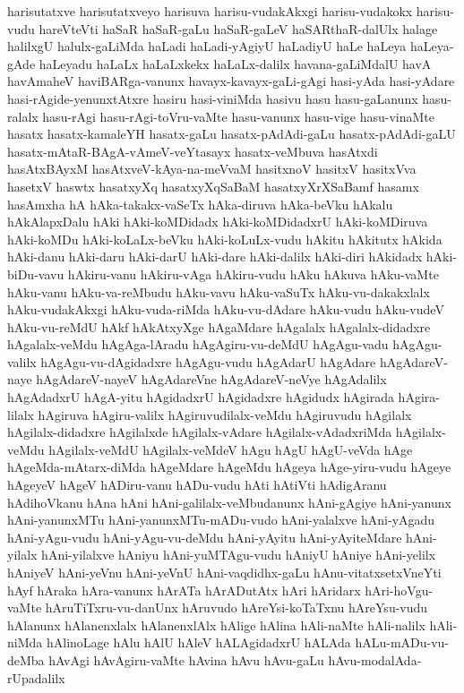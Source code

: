{harisutatxve
harisutatxveyo
harisuva
harisu-vudakAkxgi
harisu-vudakokx
harisu-vudu
hareVteVti
haSaR
haSaR-gaLu
haSaR-gaLeV
haSARthaR-dalUlx
halage
halilxgU
halulx-gaLiMda
haLadi
haLadi-yAgiyU
haLadiyU
haLe
haLeya
haLeya-gAde
haLeyadu
haLaLx
haLaLxkekx
haLaLx-dalilx
havana-gaLiMdalU
havA
havAmaheV
haviBARga-vanunx
havayx-kavayx-gaLi-gAgi
hasi-yAda
hasi-yAdare
hasi-rAgide-yenunxtAtxre
hasiru
hasi-viniMda
hasivu
hasu
hasu-gaLanunx
hasu-ralalx
hasu-rAgi
hasu-rAgi-toVru-vaMte
hasu-vanunx
hasu-vige
hasu-vinaMte
hasatx
hasatx-kamaleYH
hasatx-gaLu
hasatx-pAdAdi-gaLu
hasatx-pAdAdi-gaLU
hasatx-mAtaR-BAgA-vAmeV-veYtasayx
hasatx-veMbuva
hasAtxdi
hasAtxBAyxM
hasAtxveV-kAya-na-meVvaM
hasitxnoV
hasitxV
hasitxVva
hasetxV
haswtx
hasatxyXq
hasatxyXqSaBaM
hasatxyXrXSaBamf
hasamx
hasAmxha
hA
hAka-takakx-vaSeTx
hAka-diruva
hAka-beVku
hAkalu
hAkAlapxDalu
hAki
hAki-koMDidadx
hAki-koMDidadxrU
hAki-koMDiruva
hAki-koMDu
hAki-koLaLx-beVku
hAki-koLuLx-vudu
hAkitu
hAkitutx
hAkida
hAki-danu
hAki-daru
hAki-darU
hAki-dare
hAki-dalilx
hAki-diri
hAkidadx
hAki-biDu-vavu
hAkiru-vanu
hAkiru-vAga
hAkiru-vudu
hAku
hAkuva
hAku-vaMte
hAku-vanu
hAku-va-reMbudu
hAku-vavu
hAku-vaSuTx
hAku-vu-dakakxlalx
hAku-vudakAkxgi
hAku-vuda-riMda
hAku-vu-dAdare
hAku-vudu
hAku-vudeV
hAku-vu-reMdU
hAkf
hAkAtxyXge
hAgaMdare
hAgalalx
hAgalalx-didadxre
hAgalalx-veMdu
hAgAga-lAradu
hAgAgiru-vu-deMdU
hAgAgu-vadu
hAgAgu-valilx
hAgAgu-vu-dAgidadxre
hAgAgu-vudu
hAgAdarU
hAgAdare
hAgAdareV-naye
hAgAdareV-nayeV
hAgAdareVne
hAgAdareV-neVye
hAgAdalilx
hAgAdadxrU
hAgA-yitu
hAgidadxrU
hAgidadxre
hAgidudx
hAgirada
hAgira-lilalx
hAgiruva
hAgiru-valilx
hAgiruvudilalx-veMdu
hAgiruvudu
hAgilalx
hAgilalx-didadxre
hAgilalxde
hAgilalx-vAdare
hAgilalx-vAdadxriMda
hAgilalx-veMdu
hAgilalx-veMdU
hAgilalx-veMdeV
hAgu
hAgU
hAgU-veVda
hAge
hAgeMda-mAtarx-diMda
hAgeMdare
hAgeMdu
hAgeya
hAge-yiru-vudu
hAgeye
hAgeyeV
hAgeV
hADiru-vanu
hADu-vudu
hAti
hAtiVti
hAdigAranu
hAdihoVkanu
hAna
hAni
hAni-galilalx-veMbudanunx
hAni-gAgiye
hAni-yanunx
hAni-yanunxMTu
hAni-yanunxMTu-mADu-vudo
hAni-yalalxve
hAni-yAgadu
hAni-yAgu-vudu
hAni-yAgu-vu-deMdu
hAni-yAyitu
hAni-yAyiteMdare
hAni-yilalx
hAni-yilalxve
hAniyu
hAni-yuMTAgu-vudu
hAniyU
hAniye
hAni-yelilx
hAniyeV
hAni-yeVnu
hAni-yeVnU
hAni-vaqdidhx-gaLu
hAnu-vitatxsetxVneYti
hAyf
hAraka
hAra-vanunx
hArATa
hArADutAtx
hAri
hAridarx
hAri-hoVgu-vaMte
hAruTiTxru-vu-danUnx
hAruvudo
hAreYsi-koTaTxnu
hAreYsu-vudu
hAlanunx
hAlanenxlalx
hAlanenxlAlx
hAlige
hAlina
hAli-naMte
hAli-nalilx
hAli-niMda
hAlinoLage
hAlu
hAlU
hAleV
hALAgidadxrU
hALAda
hALu-mADu-vu-deMba
hAvAgi
hAvAgiru-vaMte
hAvina
hAvu
hAvu-gaLu
hAvu-modalAda-rUpadalilx
}
